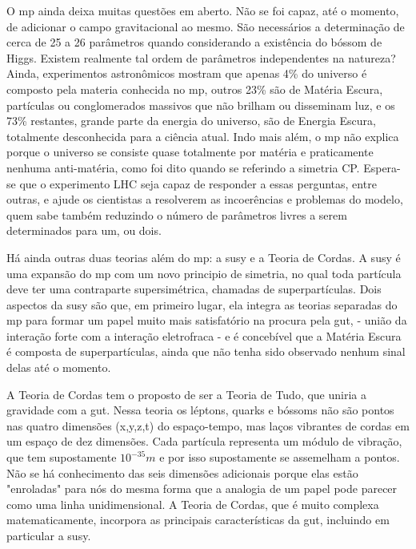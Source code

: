 O \gls{mp} ainda deixa muitas questões em aberto. Não se foi capaz, até o
momento, de adicionar o campo gravitacional ao mesmo. São necessários a
determinação de cerca de 25 a 26 parâmetros quando considerando a existência do
bóssom de Higgs. Existem realmente tal ordem de parâmetros independentes na
natureza? Ainda, experimentos astronômicos mostram que apenas 4\% do universo é
composto pela materia conhecida no \gls{mp}, outros 23\% são de Matéria
Escura, partículas ou conglomerados massivos que não brilham ou disseminam luz,
e os 73\% restantes, grande parte da energia do universo, são de Energia Escura,
totalmente desconhecida para a ciência atual. Indo mais além, o \gls{mp} 
não explica porque o universo se consiste quase totalmente por matéria e
praticamente nenhuma anti-matéria, como foi dito quando se referindo a simetria
CP. Espera-se que o experimento LHC seja capaz de responder a essas perguntas, entre outras, 
e ajude os cientistas a resolverem as incoerências e problemas do modelo, quem sabe também reduzindo 
o número de parâmetros livres a serem determinados para um, ou dois.
\cite{nature_space_and_time,Intro_Nuclear}


Há ainda outras duas teorias além do \gls{mp}: a \gls{susy} e a Teoria de Cordas. 
A \gls{susy} é uma expansão do \gls{mp} com um
novo principio de simetria, no qual toda partícula deve ter uma contraparte
supersimétrica, chamadas de superpartículas. Dois aspectos da \gls{susy} são
que, em primeiro lugar, ela integra as teorias separadas do \gls{mp} para formar
um papel muito mais satisfatório na procura pela \gls{gut}, - união da interação
forte com a interação eletrofraca - e é concebível que a Matéria Escura 
é composta de superpartículas, ainda que não tenha sido observado nenhum sinal delas 
até o momento. 

A Teoria de Cordas tem o proposto de ser a Teoria de Tudo, que uniria a
gravidade com a \gls{gut}. Nessa teoria os léptons, quarks e bóssoms não são
pontos nas quatro dimensões (x,y,z,t) do espaço-tempo, mas laços vibrantes de
cordas em um espaço de dez dimensões. Cada partícula representa um módulo de
vibração, que tem supostamente $10^{-35} m$ e por isso supostamente se
assemelham a pontos. Não se há conhecimento das seis dimensões adicionais porque
elas estão "enroladas" para nós do mesma forma que a analogia de um papel pode
parecer como uma linha unidimensional. A Teoria de Cordas, que é muito complexa
matematicamente, incorpora as principais características da \gls{gut}, incluindo
em particular a \gls{susy}.

